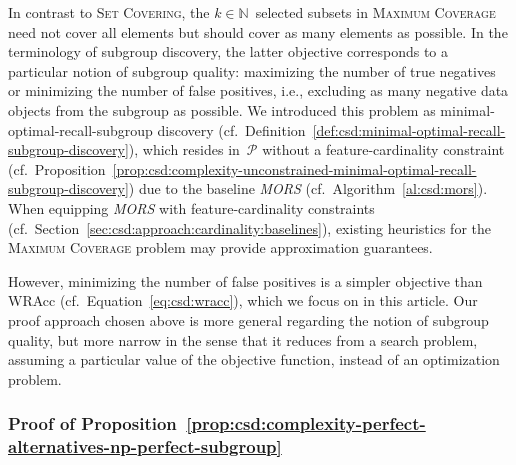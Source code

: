 \documentclass{article}
\theoremstyle{definition}
\begin{document}
In contrast to \textsc{Set Covering}, the $k \in \mathbb{N}$~selected subsets in \textsc{Maximum Coverage} need not cover all elements but should cover as many elements as possible.
In the terminology of subgroup discovery, the latter objective corresponds to a particular notion of subgroup quality:
maximizing the number of true negatives or minimizing the number of false positives, i.e., excluding as many negative data objects from the subgroup as possible.
We introduced this problem as minimal-optimal-recall-subgroup discovery (cf.~Definition~\ref{def:csd:minimal-optimal-recall-subgroup-discovery}), which resides in~$\mathcal{P}$ without a feature-cardinality constraint (cf.~Proposition~\ref{prop:csd:complexity-unconstrained-minimal-optimal-recall-subgroup-discovery}) due to the baseline \emph{MORS} (cf.~Algorithm~\ref{al:csd:mors}).
When equipping \emph{MORS} with feature-cardinality constraints (cf.~Section~\ref{sec:csd:approach:cardinality:baselines}), existing heuristics for the \textsc{Maximum Coverage} problem may provide approximation guarantees.

However, minimizing the number of false positives is a simpler objective than WRAcc (cf.~Equation~\ref{eq:csd:wracc}), which we focus on in this article.
Our proof approach chosen above is more general regarding the notion of subgroup quality, but more narrow in the sense that it reduces from a search problem, assuming a particular value of the objective function, instead of an optimization problem.

\subsubsection{Proof of Proposition~\ref{prop:csd:complexity-perfect-alternatives-np-perfect-subgroup}}
\label{sec:csd:appendix:proofs:complexity-perfect-alternatives-np-perfect-subgroup}
\end{document}

